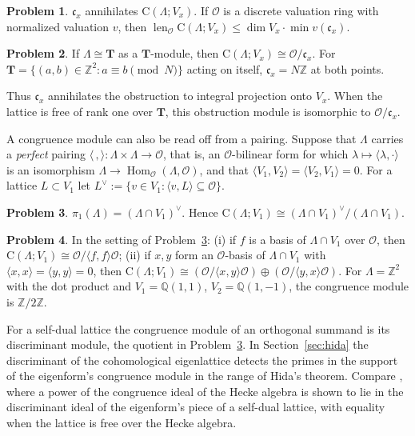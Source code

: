 \documentclass[reqno]{amsart}
\theoremstyle{definition}
\newtheorem{problem}{Problem}[section]
\theoremstyle{plain}
\newcommand{\Z}{\mathbb{Z}}
\newcommand{\Q}{\mathbb{Q}}
\newcommand{\Oc}{\mathcal{O}}
\newcommand{\T}{\mathbf{T}}
\newcommand{\cc}{\mathfrak{c}}
\newcommand{\len}{\operatorname{len}}
\newcommand{\Cg}{\mathrm{C}}
\begin{document}
\begin{problem}\label{pr:annihilate}
\(\cc_x\) annihilates \(\Cg(\Lambda; V_x)\).  If \(\Oc\) is a discrete valuation ring with normalized valuation \(v\), then \(\len_\Oc \Cg(\Lambda; V_x) \le \dim V_x \cdot \min v(\cc_x)\).
\end{problem}

\begin{problem}\label{pr:free}
If \(\Lambda \cong \T\) as a \(\T\)-module, then \(\Cg(\Lambda; V_x) \cong \Oc/\cc_x\).  For \(\T = \{(a,b) \in \Z^2 : a \equiv b \pmod N\}\) acting on itself, \(\cc_x = N\Z\) at both points.
\end{problem}

Thus \(\cc_x\) annihilates the obstruction to integral projection onto \(V_x\).  When the lattice is free of rank one over \(\T\), this obstruction module is isomorphic to \(\Oc/\cc_x\).

A congruence module can also be read off from a pairing.  Suppose that \(\Lambda\) carries a \emph{perfect} pairing \(\langle\,,\rangle \colon \Lambda \times \Lambda \to \Oc\), that is, an \(\Oc\)-bilinear form for which \(\lambda \mapsto \langle \lambda, \cdot \rangle\) is an isomorphism \(\Lambda \to \operatorname{Hom}_\Oc(\Lambda, \Oc)\), and that \(\langle V_1, V_2 \rangle = \langle V_2, V_1 \rangle = 0\).  For a lattice \(L \subset V_1\) let \(L^\vee := \{ v \in V_1 : \langle v, L \rangle \subseteq \Oc \}\).

\begin{problem}\label{pr:selfdual}
\(\pi_1(\Lambda) = (\Lambda \cap V_1)^\vee\).  Hence \(\Cg(\Lambda; V_1) \cong (\Lambda \cap V_1)^\vee / (\Lambda \cap V_1)\).
\end{problem}

\begin{problem}\label{pr:gram}
In the setting of Problem~\ref{pr:selfdual}:
(i) if \(f\) is a basis of \(\Lambda\cap V_1\) over \(\Oc\), then \(\Cg(\Lambda; V_1) \cong \Oc/\langle f, f \rangle\Oc\);
(ii) if \(x,y\) form an \(\Oc\)-basis of \(\Lambda\cap V_1\) with \(\langle x, x \rangle = \langle y, y \rangle = 0\), then \(\Cg(\Lambda; V_1) \cong (\Oc/\langle x, y \rangle\Oc) \oplus (\Oc/\langle y, x \rangle\Oc)\).
For \(\Lambda = \Z^2\) with the dot product and \(V_1 = \Q(1,1)\), \(V_2 = \Q(1,-1)\), the congruence module is \(\Z/2\Z\).
\end{problem}

For a self-dual lattice the congruence module of an orthogonal summand is its discriminant module, the quotient in Problem~\ref{pr:selfdual}.  In Section~\ref{sec:hida} the discriminant of the cohomological eigenlattice detects the primes in the support of the eigenform's congruence module in the range of Hida's theorem.  Compare \cite[\S4.4, Lemma~4.17]{DDT}, where a power of the congruence ideal of the Hecke algebra is shown to lie in the discriminant ideal of the eigenform's piece of a self-dual lattice, with equality when the lattice is free over the Hecke algebra.
\end{document}
